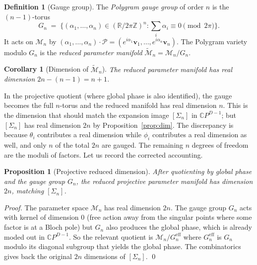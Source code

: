 \documentclass[11pt,letterpaper]{article}
\newtheorem{proposition}[theorem]{Proposition}
\newtheorem{corollary}[theorem]{Corollary}
\theoremstyle{definition}
\newtheorem{definition}[theorem]{Definition}
\newcommand{\C}{\mathbb{C}}
\newcommand{\R}{\mathbb{R}}
\newcommand{\Z}{\mathbb{Z}}
\newcommand{\Polygram}{\mathcal{P}}
\newcommand{\Mset}{\mathcal{M}}
\begin{document}
\begin{definition}[Gauge group]
\label{def:gauge}
The \emph{Polygram gauge group} of order $n$ is the $(n-1)$-torus
\[
G_{n} \;=\; \big\{(\alpha_{1}, \dots, \alpha_{n}) \in (\R / 2\pi \Z)^{n} :
   \textstyle\sum_{i} \alpha_{i} \equiv 0 \pmod{2\pi}\big\}.
\]
It acts on $\Mset_{n}$ by $(\alpha_{1}, \dots, \alpha_{n}) \cdot
\Polygram = (e^{i\alpha_{1}} \bm{v}_{1}, \dots, e^{i\alpha_{n}} \bm{v}_{n})$.
The Polygram variety modulo $G_{n}$ is the \emph{reduced parameter manifold}
$\widetilde{\Mset}_{n} = \Mset_{n} / G_{n}$.
\end{definition}

\begin{corollary}[Dimension of $\widetilde{\Mset}_{n}$]
\label{cor:reduced-dim}
The reduced parameter manifold has real dimension $2n - (n - 1) = n + 1$.
\end{corollary}

In the projective quotient (where global phase is also identified), the
gauge becomes the full $n$-torus and the reduced manifold has real
dimension $n$. This is the dimension that should match the expansion image
$[\Sigma_{n}]$ in $\C P^{D - 1}$; but $[\Sigma_{n}]$ has real dimension $2n$
by Proposition~\ref{prop:dim}. The discrepancy is because $\theta_{i}$
contributes a real dimension while $\phi_{i}$ contributes a real dimension as
well, and only $n$ of the total $2n$ are gauged. The remaining $n$ degrees of
freedom are the moduli of factors. Let us record the corrected accounting.

\begin{proposition}[Projective reduced dimension]
\label{prop:proj-reduced}
After quotienting by global phase and the gauge group $G_{n}$, the reduced
projective parameter manifold has dimension $2n$, matching $[\Sigma_{n}]$.
\end{proposition}

\begin{proof}
The parameter space $\Mset_{n}$ has real dimension $2n$. The gauge group
$G_{n}$ acts with kernel of dimension $0$ (free action away from the singular
points where some factor is at a Bloch pole) but $G_{n}$ also produces the
global phase, which is already moded out in $\C P^{D-1}$. So the relevant
quotient is $\Mset_{n} / G_{n}^{\mathrm{eff}}$ where $G_{n}^{\mathrm{eff}}$ is
$G_{n}$ modulo its diagonal subgroup that yields the global phase. The
combinatorics gives back the original $2n$ dimensions of $[\Sigma_{n}]$.
\qed
\end{proof}
\end{document}
